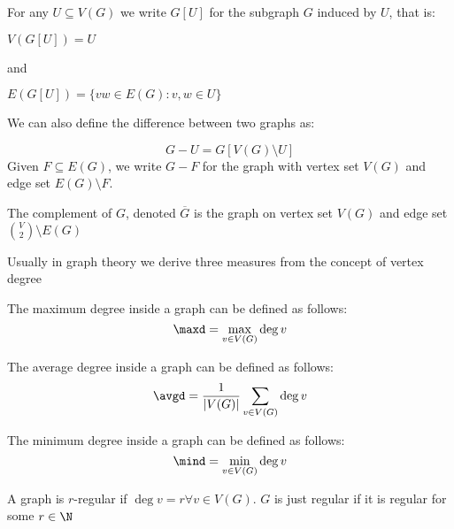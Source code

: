 For any $U \subseteq V(G)$ we write $G[U]$ for the subgraph $G$ induced by $U$, that is:

$V(G[U]) = U$

and

$E(G[U]) = \{vw \in E(G): v, w \in U\}$

We can also define the difference between two graphs as:

\begin{equation*}
    G - U = G[V(G) \setminus U]
\end{equation*}
Given $F \subseteq E(G)$, we write $G - F$ for the graph with vertex set $V(G)$ and edge set $E(G) \setminus F$.

\begin{definition}[Complement]
    The complement of $G$, denoted $\overline{G}$ is the graph on vertex set $V(G)$ and edge set $\binom{V}{2} \setminus E(G)$
\end{definition}
Usually in graph theory we derive three measures from the concept of vertex degree
\begin{definition}
    The maximum degree inside a graph can be defined as follows:
    \begin{equation*}
        \maxd = \max_{v \in V(G)}\deg{v}
    \end{equation*}
\end{definition}
\begin{definition}
    The average degree inside a graph can be defined as follows:
    \begin{equation*}
        \avgd = \frac{1}{|V(G)|}\sum_{v \in V(G)}\deg{v}
    \end{equation*}
\end{definition}
\begin{definition}
    The minimum degree inside a graph can be defined as follows:
    \begin{equation*}
        \mind = \min_{v \in V(G)}\deg{v}
    \end{equation*}
\end{definition}
\begin{definition}
    A graph is $r$-regular if $\deg{v} = r \forall v \in V(G)$. $G$ is just regular if it is regular for some $r \in \N$
\end{definition}

